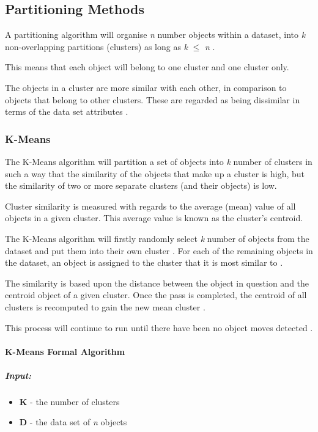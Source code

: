 \subsection{Partitioning Methods}
A partitioning algorithm will organise {\emph n} number objects within a 
dataset, into {\emph k} non-overlapping partitions (clusters) as long as 
{\emph k} $\leq$ {\emph n} \citep{han06}. 

This means that each object will belong to one cluster and one cluster only. 

The objects in a cluster are more similar with each other, in comparison to 
objects that belong to other clusters. These are regarded as being dissimilar 
in terms of the data set attributes \citep{tan05}.

\subsubsection{K-Means}
The K-Means algorithm will partition a set of objects into {\emph k} number of 
clusters in such a way that the similarity of the objects that make up a 
cluster is high, but the similarity of two or more separate clusters (and their 
objects) is low.

Cluster similarity is measured with regards to the average (mean) value of all 
objects in a given cluster. This average value is known as the cluster's 
centroid.

The K-Means algorithm will firstly randomly select {\em k} number of objects 
from the dataset and put them into their own cluster \citep{han06}. For each of
the remaining objects in the dataset, an object is assigned to the cluster that
it is most similar to \citep{tan05}.

The similarity is based upon the distance between the object in question and 
the centroid object of a given cluster. Once the pass is completed, the 
centroid of all clusters is recomputed to gain the new mean cluster 
\citep{tan05}. 

This process will continue to run until there have been no object moves 
detected \citep{han06}.

\paragraph*{K-Means Formal Algorithm}
\subparagraph*{Input:}
\begin{itemize}
  \item {\bf K} - the number of clusters
  \item {\bf D} - the data set of {\em n} objects
\end{itemize}

